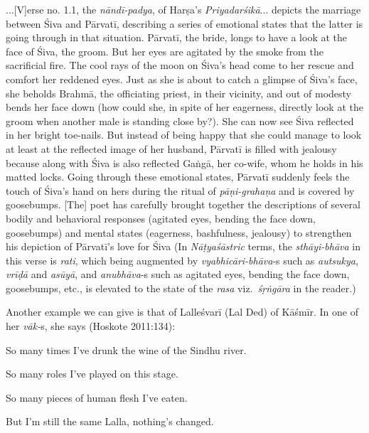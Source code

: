 \begin{myquote}
...[V]erse no. 1.1, the \textsl{nāndī-padya}, of Harṣa’s \textsl{Priyadarśikā}... depicts the marriage between Śiva and Pārvatī, describing a series of emotional states that the latter is going through in that situation. Pārvatī, the bride, longs to have a look at the face of Śiva, the groom. But her eyes are agitated by the smoke from the sacrificial fire. The cool rays of the moon on Śiva’s head come to her rescue and comfort her reddened eyes. Just as she is about to catch a glimpse of Śiva’s face, she beholds Brahmā, the officiating priest, in their vicinity, and out of modesty bends her face down (how could she, in spite of her eagerness, directly look at the groom when another male is standing close by?). She can now see Śiva reflected in her bright toe-nails. But instead of being happy that she could manage to look at least at the reflected image of her husband, Pārvatī is filled with jealousy because along with Śiva is also reflected Gaṅgā, her co-wife, whom he holds in his matted locks. Going through these emotional states, Pārvatī suddenly feels the touch of Śiva’s hand on hers during the ritual of \textsl{pāṇi-grahaṇa} and is covered by goosebumps. [The] poet has carefully brought together the descriptions of several bodily and behavioral responses (agitated eyes, bending the face down, goosebumps) and mental states (eagerness, bashfulness, jealousy) to strengthen his depiction of Pārvatī’s love for Śiva (In \textsl{Nāṭyaśāstric} terms, the \textsl{sthāyi-bhāva} in this verse is \textsl{rati}, which being augmented by \textsl{vyabhicāri-bhāva}-s such as \textsl{autsukya}, \textsl{vrīḍā} and \textsl{asūyā}, and \textsl{anubhāva}-s such as agitated eyes, bending the face down, goosebumps, etc., is elevated to the state of the \textsl{rasa} viz.\ \textsl{śṛṅgāra} in the reader.)
\end{myquote}

Another example we can give is that of Lalleśvarī (Lal Ded) of Kāśmīr. In one of her \textsl{vāk-}s, she says (Hoskote 2011:134):

\begin{myquote}
So many times I’ve drunk the wine of the Sindhu river.

So many roles I’ve played on this stage.

So many pieces of human flesh I’ve eaten.

But I’m still the same Lalla, nothing’s changed.
\end{myquote}

